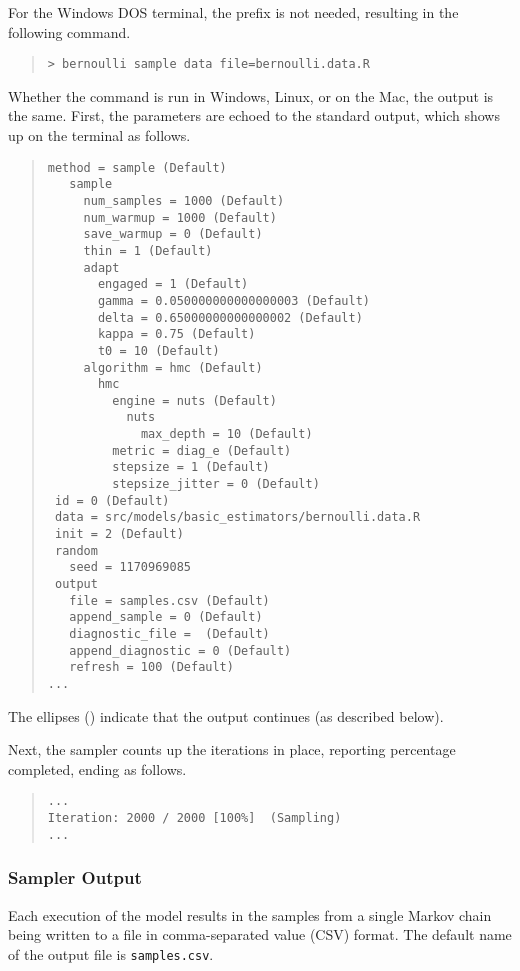 For the Windows DOS terminal, the  prefix is not needed,
resulting in the following command.
%
\begin{quote}
\begin{Verbatim}[fontshape=sl]
> bernoulli sample data file=bernoulli.data.R
\end{Verbatim}
\end{quote}
%
Whether the command is run in Windows, Linux, or on the Mac, the
output is the same.  First, the parameters are echoed to the standard output,
which shows up on the terminal as follows.
%
\begin{quote}
\begin{Verbatim}[fontsize=\small]
 method = sample (Default)
   sample
     num_samples = 1000 (Default)
     num_warmup = 1000 (Default)
     save_warmup = 0 (Default)
     thin = 1 (Default)
     adapt
       engaged = 1 (Default)
       gamma = 0.050000000000000003 (Default)
       delta = 0.65000000000000002 (Default)
       kappa = 0.75 (Default)
       t0 = 10 (Default)
     algorithm = hmc (Default)
       hmc
         engine = nuts (Default)
           nuts
             max_depth = 10 (Default)
         metric = diag_e (Default)
         stepsize = 1 (Default)
         stepsize_jitter = 0 (Default)
 id = 0 (Default)
 data = src/models/basic_estimators/bernoulli.data.R
 init = 2 (Default)
 random
   seed = 1170969085
 output
   file = samples.csv (Default)
   append_sample = 0 (Default)
   diagnostic_file =  (Default)
   append_diagnostic = 0 (Default)
   refresh = 100 (Default)
...
\end{Verbatim}
\end{quote}
%
The ellipses () indicate that the output continues (as
described below).

Next, the sampler counts up the iterations in place, reporting
percentage completed, ending as follows.
%
\begin{quote}
\begin{Verbatim}[fontsize=\small]
...
Iteration: 2000 / 2000 [100%]  (Sampling)
...
\end{Verbatim}
\end{quote}

\subsubsection{Sampler Output}

Each execution of the model results in the samples from a single
Markov chain being written to a file in comma-separated value (CSV) format.
The default name of the output file is \nolinkurl{samples.csv}.

